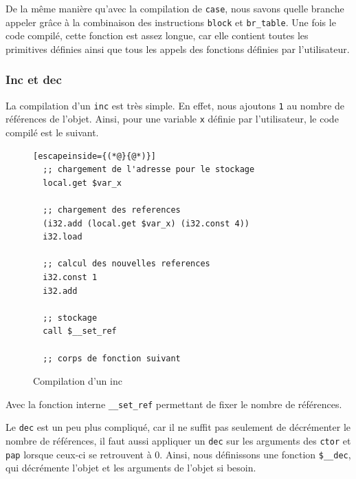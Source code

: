 \documentclass{rapportECL}
\begin{document}
De la même manière qu'avec la compilation de \verb|case|, nous savons quelle branche appeler grâce à la combinaison des instructions \verb|block| et \verb|br_table|. Une fois le code compilé, cette fonction est assez longue, car elle contient toutes les primitives définies ainsi que tous les appels des fonctions définies par l'utilisateur.

\subsubsection{Inc et dec}

La compilation d'un \verb|inc| est très simple. En effet, nous ajoutons \verb|1| au nombre de références de l'objet. 
Ainsi, pour une variable \verb|x| définie par l'utilisateur, le code compilé est le suivant.

\begin{figure}[H]
	\begin{lstlisting}[escapeinside={(*@}{@*)}]
  ;; chargement de l'adresse pour le stockage
  local.get $var_x

  ;; chargement des references
  (i32.add (local.get $var_x) (i32.const 4))
  i32.load
   
  ;; calcul des nouvelles references
  i32.const 1
  i32.add

  ;; stockage
  call $__set_ref

  ;; corps de fonction suivant
	\end{lstlisting}
	\caption{Compilation d'un inc}
	\label{listing:compile_inc}
\end{figure}

Avec la fonction interne \verb|__set_ref| permettant de fixer le nombre de références.


Le \verb|dec| est un peu plus compliqué, car il ne suffit pas seulement de décrémenter le nombre de références, il faut aussi appliquer un \verb|dec| sur les arguments des \verb|ctor| et \verb|pap| lorsque ceux-ci se retrouvent à 0.
Ainsi, nous définissons une fonction \verb|$__dec|, qui décrémente l'objet et les arguments de l'objet si besoin.
\end{document}
